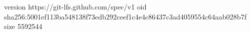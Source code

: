 version https://git-lfs.github.com/spec/v1
oid sha256:5001ef113ba548138f73edb292ceef1c4e4c86437c3ad4059554c64aab028b7f
size 5592544
